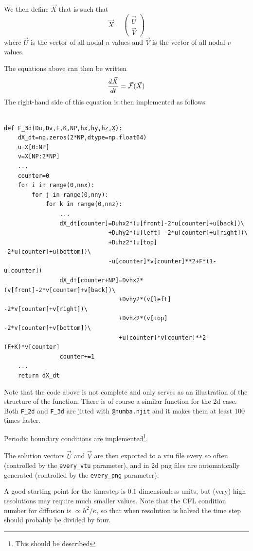 We then define $\vec{X}$ that is such that 
\[
\vec{X} = 
\left(
\begin{array}{c}
\vec{U} \\ \vec{V}
\end{array}
\right)
\] 
where $\vec{U}$ is the vector of all nodal $u$ values and 
$\vec{V}$ is the vector of all nodal $v$ values.

The equations above can then be written 
\[
\frac{d\vec{X}}{dt} 
= \vec{\cal F} (\vec{X})
\]
The right-hand side of this equation is then implemented as follows:
\begin{lstlisting}

def F_3d(Du,Dv,F,K,NP,hx,hy,hz,X):
    dX_dt=np.zeros(2*NP,dtype=np.float64)
    u=X[0:NP]
    v=X[NP:2*NP]
    ...
    counter=0
    for i in range(0,nnx):
        for j in range(0,nny):
            for k in range(0,nnz):
                ... 
                dX_dt[counter]=Duhx2*(u[front]-2*u[counter]+u[back])\
                              +Duhy2*(u[left] -2*u[counter]+u[right])\
                              +Duhz2*(u[top]  -2*u[counter]+u[bottom])\
                              -u[counter]*v[counter]**2+F*(1-u[counter])
                dX_dt[counter+NP]=Dvhx2*(v[front]-2*v[counter]+v[back])\
                                 +Dvhy2*(v[left] -2*v[counter]+v[right])\
                                 +Dvhz2*(v[top]  -2*v[counter]+v[bottom])\
                                 +u[counter]*v[counter]**2-(F+K)*v[counter]
                counter+=1
    ...
    return dX_dt
\end{lstlisting}
Note that the code above is not complete and only serves as an 
illustration of the structure of the function.
There is of course a similar function for the 2d case.
Both \lstinline{F_2d} and \lstinline{F_3d} are jitted with
\lstinline{@numba.njit} and it makes them at least 100 times faster.

Periodic boundary conditions are implemented\footnote{This should be described}.

The solution vectors $\vec{U}$ and $\vec{V}$ are then exported to 
a vtu file every so often (controlled by the \lstinline{every_vtu} parameter),
and in 2d png files are automatically generated (controlled by 
the \lstinline{every_png} parameter).

A good starting point for the timestep is 0.1 dimensionless units, but 
(very) high resolutions may require much smaller values.
Note that the CFL condition number for diffusion is $\propto h^2/\kappa$, 
so that when resolution is halved the time step should probably be divided by four. 

